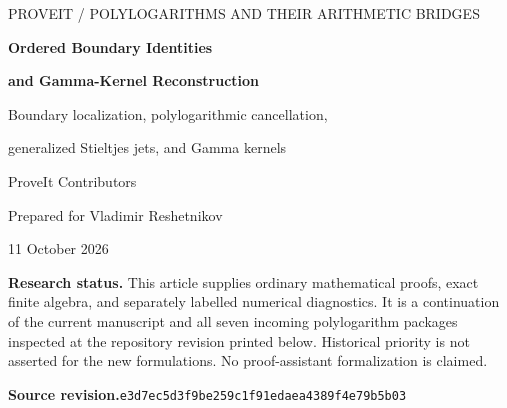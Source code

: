 \documentclass[11pt,a4paper]{article}
\numberwithin{equation}{section}
\theoremstyle{definition}
\theoremstyle{remark}
\begin{document}
\hypersetup{pageanchor=false}
\begin{titlepage}
\centering
\vspace*{16mm}
{\small\sffamily\color{MidnightBlue} PROVEIT \quad / \quad POLYLOGARITHMS AND THEIR ARITHMETIC BRIDGES\par}
\vspace{15mm}
{\LARGE\bfseries Ordered Boundary Identities\par}
\vspace{2mm}
{\Large\bfseries and Gamma-Kernel Reconstruction\par}
\vspace{4mm}
{\Large Boundary localization, polylogarithmic cancellation,\par
 generalized Stieltjes jets, and Gamma kernels\par}
\vspace{13mm}
{\large ProveIt Contributors\par}
\vspace{3mm}
{Prepared for Vladimir Reshetnikov\par}
\vspace{5mm}
{11 October 2026\par}
\vfill
\begin{minipage}{0.88\textwidth}
\small
\textbf{Research status.} This article supplies ordinary mathematical proofs,
exact finite algebra, and separately labelled numerical diagnostics.
It is a continuation of the current manuscript and all seven incoming
polylogarithm packages inspected at the repository revision printed below.
Historical priority is not asserted for the new formulations.
No proof-assistant formalization is claimed.
\par\medskip
\textbf{Source revision.}\quad\texttt{e3d7ec5d3f9be259c1f91edaea4389f4e79b5b03}
\end{minipage}
\vspace{10mm}
\end{titlepage}
\hypersetup{pageanchor=true}
\end{document}
